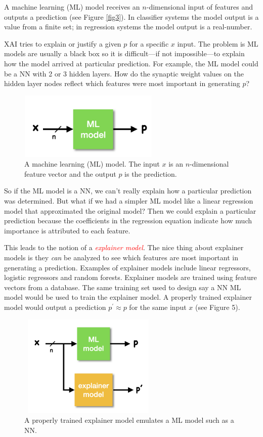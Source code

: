 \documentclass{article}   	%
\begin{document}
A machine learning (ML) model receives an $n$-dimensional input of features and outputs a prediction (see Figure \ref{fig3}). In classifier systems the model output is a value from a finite set; in regression systems the model output is a real-number.


XAI tries to explain or justify a given $p$ for a specific $x$ input. The problem is ML models are usually a black box so it is difficult---if not impossible---to explain how the model arrived at particular prediction. For example, the ML model could be a NN with 2 or 3 hidden layers. How do the synaptic weight values on the hidden layer nodes reflect which features were most important in generating $p$?


\begin{figure}[htb]
\centerline{\includegraphics[width=6.7cm,height=3.2cm]{ML}}
\caption{A machine learning (ML) model. The input $x$ is an $n$-dimensional feature vector and the output $p$ is the prediction. }
\label{fig4}
\end{figure}

So if the ML model is a NN, we can't really explain how a particular prediction was determined. But what if we had a simpler ML model like a linear regression model that approximated the original model? Then we could explain a particular prediction because the coefficients in the regression equation indicate how much importance is attributed to each feature.

This leads to the notion of a \textcolor{red}{\textit{explainer model}}. The nice thing about explainer models is they \textit{can} be analyzed to see which features are most important in generating a prediction. Examples of explainer models include linear regressors, logistic regressors and random forests. Explainer models are trained using feature vectors from a database. The same training set used to design say a NN ML model would be used to train the explainer model.  A properly trained explainer model would output a prediction $p^{\prime} \approx p$ for the same input $x$ (see Figure 5). 

\begin{figure}[htb]
\centerline{\includegraphics[width=6.7cm,height=4.9cm]{explainer}}
\caption{A properly trained explainer model emulates a ML model such as a NN.}
\label{fig5}
\end{figure}
\end{document}
